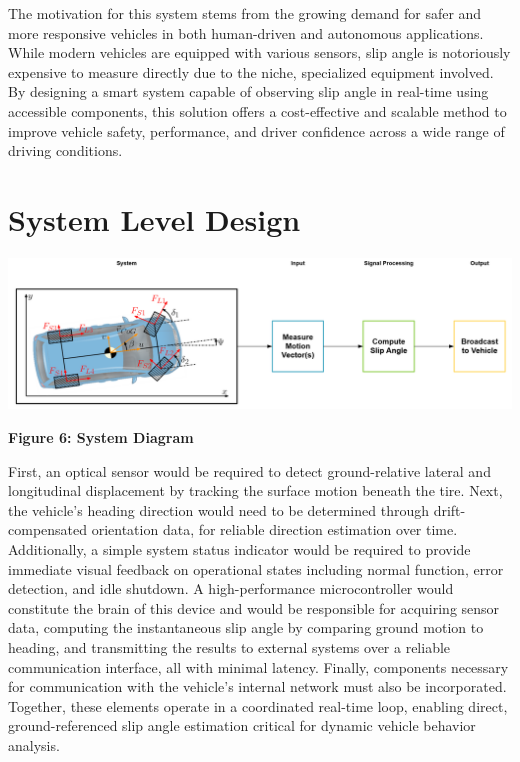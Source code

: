 \documentclass[12pt]{article}
\begin{document}
        The motivation for this system stems from the growing demand for safer and more responsive vehicles in both human-driven 
        and autonomous applications. While modern vehicles are equipped with various sensors, slip angle is notoriously expensive 
        to measure directly due to the niche, specialized equipment involved. By designing a smart system capable of observing slip 
        angle in real-time using accessible components, this solution offers a cost-effective and scalable method to improve vehicle 
        safety, performance, and driver confidence across a wide range of driving conditions. 

    \section{System Level Design}
        
        \begin{center}
            \vspace{0.5cm}

            \includegraphics[width=1\textwidth]{resources/image.png}

            \vspace{0.5cm}

            \textbf{Figure 6: System Diagram}
            \label{diag}
        
        \end{center}
        
        First, an optical sensor would be required to detect ground-relative lateral and longitudinal displacement by tracking the surface motion 
        beneath the tire. Next, the vehicle’s heading direction would need to be determined through drift-compensated orientation data, for reliable 
        direction estimation over time. Additionally, a simple system status indicator would be required to provide immediate visual feedback on operational 
        states including normal function, error detection, and idle shutdown. A high-performance microcontroller would constitute the brain of this device 
        and would be responsible for acquiring sensor data, computing the instantaneous slip angle by comparing ground motion to heading, and transmitting 
        the results to external systems over a reliable communication interface, all with minimal latency. Finally, components necessary for communication 
        with the vehicle’s internal network must also be incorporated. Together, these elements operate in a coordinated real-time loop, enabling direct, 
        ground-referenced slip angle estimation critical for dynamic vehicle behavior analysis.
\end{document}
